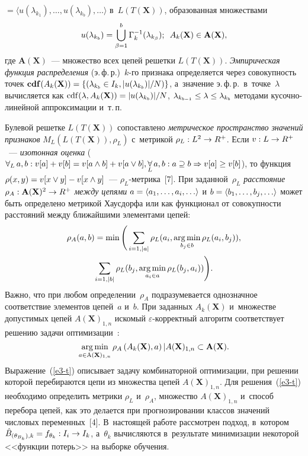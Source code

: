 \begin{multicols}{2}
\pagebreak

\noindent
${}= \langle u(\lambda_{k_1}), 
\ldots , u(\lambda_{k_b}), \ldots\rangle$ в~$L({T}(\mathbf{X}))$, 
образованная множествами 
$$
u(\lambda_{k_b}) = \mathop{\bigcup}\limits^b_{\beta=1} 
\Gamma_k^{-1} (\lambda_{k_\beta});\enskip {A}_k(\mathbf{X})\in  \mathbf{A}(\mathbf{X}),
$$
 где $\mathbf{A}(\mathbf{X})$~--- множество всех 
цепей решетки $L({T}(\mathbf{X}))$. \textit{Эмпирическая функция 
распределения} (э.\,ф.\,р.)\ $k$-го признака определяется через совокупность 
точек $\mathbf{cdf} ({A}_k(\mathbf{X})) \hm= \{ (\lambda_{k_b}\hm\in 
I_k, \vert u(\lambda_{k_b})\vert /N)\}$, а~значение э.\,ф.\,р.\ в~точке~$\lambda$ 
вычисляется как $\mathrm{cdf} (\lambda, {A}_k(\mathbf{X}))\hm= \vert 
u(\lambda_{k_b})\vert /N$, $\lambda_{k_{b-1}}\hm\leq \lambda\hm\leq \lambda_{k_b}$ 
методами ку\-соч\-но-ли\-ней\-ной аппроксимации и~т.\,п.
     
     Булевой решетке $L({T}(\mathbf{X}))$ со\-по\-став\-ле\-но 
\textit{мет\-ри\-че\-ское пространство значений признаков} 
$M_L(L({T}(\mathbf{X})), \rho_L)$ с~мет\-ри\-кой $\rho_L: L^2\hm\to 
R^+$. Если $v: L\hm\to R^+$~--- \textit{изотонная оценка} 
($\forall_L\,a,b: v[a]\hm+ v[b]\hm= v[a\wedge b] +v[a\vee b], 
\underset{L}{\forall}\,a,b: a\supseteq b \hm\Rightarrow v[a]\hm\geq v[b]$), то 
функция $\rho(x,y)\hm= v[x\vee y]\hm- v[x\wedge y]$~---  
$\rho_L$-мет\-ри\-ка~[7]. При заданной~$\rho_L$ \textit{расстояние} $\rho_A: 
\mathbf{A}(\mathbf{X})^2\hm\to R^+$ \textit{между цепями} $a\hm= \langle a_1, 
\ldots , a_i, \ldots\rangle$ {и} $b\hm= \langle b_1, \ldots , b_j, \ldots\rangle$ 
может быть определено метрикой Хаусдорфа или как функционал от 
совокупности расстояний между ближайшими элементами цепей: 
\begin{multline*}
\rho_A(a,b)\hm= \min\Bigg( \sum\limits_{i=1,\vert a\vert} \rho_L(a_i, 
\argmin\limits_{b_j\in b} \rho_L(a_i,b_j)),\\
\sum\limits_{i=1,\vert b\vert} 
\rho_L(b_j, \argmin\limits_{a_i\in a} \rho_L(b_j,a_i))\Bigg).
\end{multline*}
 Важно, что при 
любом определении~$\rho_A$ подразумевается однозначное соответствие 
элементов цепей~$a$ и~$b$. При заданных ${A}_k(\mathbf{X})$ 
и~множестве допустимых цепей ${A}(\mathbf{X})_{1,n}$ искомый 
$\varepsilon$-кор\-рект\-ный алгоритм соответствует решению задачи 
оптимизации~\cite{5-t}:
     \begin{equation}
     \mathop{\mathrm{arg}\,\mathrm{min}}\limits_{a\in \mathrm{A}(\mathbf{X})_{1,n}} \rho_A \left( 
{A}_k(\mathbf{X}),a\right)\vert {A}(\mathbf{X})_{1,n}\subset 
\mathbf{A}(\mathbf{X}).
     \label{e3-t}
     \end{equation}
Выражение~(\ref{e3-t}) описывает задачу комбинаторной оптимизации, при 
решении которой перебираются цепи из множества цепей 
${A}(\mathbf{X})_{1,n}$. Для решения~(\ref{e3-t}) необходимо 
определить метрики $\rho_L$ и~$\rho_A$, множество 
${A}(\mathbf{X})_{1,n}$ и~способ перебора цепей, как это делается при 
прогнозировании классов значений числовых переменных~[4]. В~настоящей 
работе рассмотрен подход, в~котором $\hat{{B}}_{(\theta_{B_k}),k} 
\hm= f_{\theta_k}: I_i \hm\to I_k$, а~$\theta_k$ вычисляются в~результате 
минимизации некоторой <<функции потерь>> на выборке обучения. 


\end{multicols}
